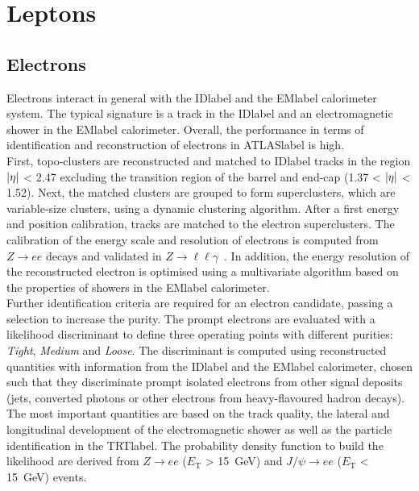 \clearpage
\section{Leptons}

\subsection{Electrons}

Electrons interact in general with the \acrshort{IDlabel} and the \acrshort{EMlabel} calorimeter system. The typical signature is a track in the \acrshort{IDlabel} and an electromagnetic shower in the \acrshort{EMlabel} calorimeter. Overall, the performance in terms of identification and reconstruction of electrons in \acrshort{ATLASlabel} is high.\\

First, topo-clusters are reconstructed and matched to \acrshort{IDlabel} tracks in the region $\abs{\eta}$ < 2.47 excluding the transition region of the barrel and end-cap (1.37 < $\abs{\eta}$ < 1.52). Next, the matched clusters are grouped to form superclusters, which are variable-size clusters, using a dynamic clustering algorithm. After a first energy and position calibration, tracks are matched to the electron superclusters. The calibration of the energy scale and resolution of electrons is computed from $Z\rightarrow ee$ decays and validated in $Z\rightarrow \ell\ell\gamma$~\cite{performanceEgamma}. In addition, the energy resolution of the reconstructed electron is optimised using a multivariate algorithm based on the properties of showers in the \acrshort{EMlabel} calorimeter.\\

Further identification criteria are required for an electron candidate, passing a selection to increase the purity. The prompt electrons are evaluated with a likelihood discriminant to define three operating points with different purities: \textit{Tight}, \textit{Medium} and \textit{Loose}. The discriminant is computed using reconstructed quantities with information from the \acrshort{IDlabel} and the \acrshort{EMlabel} calorimeter, chosen such that they discriminate prompt isolated electrons from other signal deposits (jets, converted photons or other electrons from heavy-flavoured hadron decays). The most important quantities are based on the track quality, the lateral and longitudinal development of the electromagnetic shower as well as the particle identification in the \acrshort{TRTlabel}. The probability density function to build the likelihood are derived from $Z\rightarrow ee$ ($E_\text{T}$ > 15~GeV) and $J/\psi \rightarrow ee$ ($E_\text{T}$ < 15~GeV) events.\\

